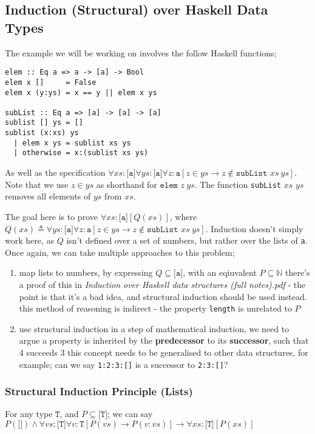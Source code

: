 \documentclass[a4paper, 12pt]{article}
\begin{document}
        \subsection*{Induction (Structural) over Haskell Data Types}
            The example we will be working on involves the follow Haskell functions;
            \begin{verbatim}
elem :: Eq a => a -> [a] -> Bool
elem x []     = False
elem x (y:ys) = x == y || elem x ys

subList :: Eq a => [a] -> [a] -> [a]
sublist [] ys = []
sublist (x:xs) ys
  | elem x ys = sublist xs ys
  | otherwise = x:(sublist xs ys)\end{verbatim}
            As well as the specification $\forall xs : \texttt{[a]} \forall ys : \texttt{[a]} \forall z : \texttt{a} [z \in ys \rightarrow z \not\in \texttt{subList } xs\ ys]$. Note that we use $z \in ys$ as shorthand for $\texttt{elem } z\ ys$. The function \texttt{subList} $xs$ $ys$ removes all elements of $ys$ from $xs$.
            \medskip

            The goal here is to prove $\forall xs : \texttt{[a]} [Q(xs)]$, where $Q(xs) \triangleq \forall ys : \texttt{[a]} \forall z : \texttt{a} [z \in ys \rightarrow z \not\in \texttt{subList }xs\ ys]$. Induction doesn't simply work here, as $Q$ isn't defined over a set of numbers, but rather over the lists of \texttt{a}. Once again, we can take multiple approaches to this problem;
            \begin{enumerate}[1.]
                \itemsep0em
                \item map lists to numbers, by expressing $Q \subseteq \texttt{[a]}$, with an eqiuvalent $P \subseteq \mathbb{N}$
                    \subitem there's a proof of this in \textit{Induction over Haskell data structures (full notes).pdf} - the point is that it's a bad idea, and structural induction should be used instead.
                    \subitem this method of reasoning is indirect - the property \texttt{length} is unrelated to $P$
                \item use structural induction
                    \subitem in a step of mathematical induction, we need to argue a property is inherited by the \textbf{predecessor} to its \textbf{successor}, such that 4 succeeds 3
                    \subitem this concept needs to be generalised to other data structures, for example; can we say \texttt{1:2:3:[]} is a successor to \texttt{2:3:[]}?
            \end{enumerate}
            \subsubsection*{Structural Induction Principle (Lists)}
                For any type $\texttt{T}$, and $P \subseteq \texttt{[T]}$; we can say $P(\texttt{[]}) \land \forall vs : \texttt{[T]} \forall v : \texttt{T} [P(vs) \rightarrow P(v : vs)] \rightarrow \forall xs : \texttt{[T]} [P(xs)]$
                \medskip
\end{document}
